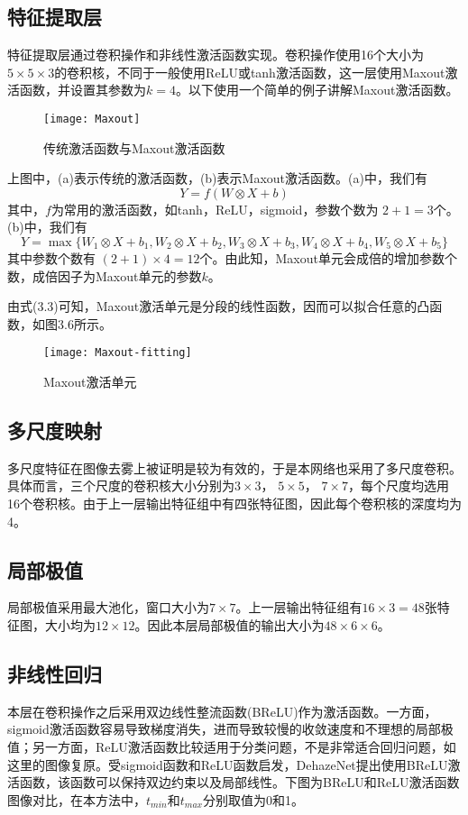 \documentclass[a4paper, 12pt, oneside]{report}
\begin{document}
{\subsection{特征提取层\quad}
特征提取层通过卷积操作和非线性激活函数实现。卷积操作使用16个大小为$5 \times 5 \times 3$的卷积核，不同于一般使用ReLU或tanh激活函数，这一层使用Maxout\cite{ref19}激活函数，并设置其参数为$k = 4$。以下使用一个简单的例子讲解Maxout激活函数。
\begin{figure}[H]
\centering
\texttt{[image: Maxout]}
\caption{传统激活函数与Maxout激活函数}
\end{figure}
上图中，(a)表示传统的激活函数，(b)表示Maxout激活函数。(a)中，我们有$$Y = f(W \otimes X + b)$$
其中，$f$为常用的激活函数，如tanh，ReLU，sigmoid，参数个数为 $2 + 1 = 3$个。(b)中，我们有
\begin{equation}
Y = \max\{W_1 \otimes X + b_1, W_2 \otimes X + b_2, W_3 \otimes X + b_3, W_4 \otimes X + b_4, W_5 \otimes X + b_5\}
\end{equation}
其中参数个数有 $(2 + 1) \times 4 = 12$个。由此知，Maxout单元会成倍的增加参数个数，成倍因子为Maxout单元的参数$k$。

由式(3.3)可知，Maxout激活单元是分段的线性函数，因而可以拟合任意的凸函数，如图3.6所示。
\begin{figure}[H]
\centering
\texttt{[image: Maxout-fitting]}
\caption{Maxout激活单元}
\end{figure}

\subsection{多尺度映射\quad}
多尺度特征在图像去雾上被证明是较为有效的，于是本网络也采用了多尺度卷积。具体而言，三个尺度的卷积核大小分别为$3\times 3$， $5\times 5$， $7\times 7$，每个尺度均选用16个卷积核。由于上一层输出特征组中有四张特征图，因此每个卷积核的深度均为4。

\subsection{局部极值\quad}
局部极值采用最大池化，窗口大小为$7\times 7$。上一层输出特征组有$16 \times 3 = 48$张特征图，大小均为$12 \times 12$。因此本层局部极值的输出大小为$48 \times 6 \times 6$。

\subsection{非线性回归\quad}
本层在卷积操作之后采用双边线性整流函数(BReLU)作为激活函数。一方面，sigmoid激活函数容易导致梯度消失，进而导致较慢的收敛速度和不理想的局部极值；另一方面，ReLU激活函数比较适用于分类问题，不是非常适合回归问题，如这里的图像复原。受sigmoid函数和ReLU函数启发，DehazeNet提出使用BReLU激活函数，该函数可以保持双边约束以及局部线性。下图为BReLU和ReLU激活函数图像对比，在本方法中，$t_{min}$和$t_{max}$分别取值为0和1。

}
\end{document}
